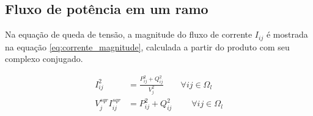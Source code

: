 \subsection{Fluxo de potência em um ramo}

Na equação de queda de tensão, a magnitude do fluxo de corrente $I_{ij}$ é mostrada na equação \ref{eq:corrente_magnitude}, calculada a partir do produto com seu complexo conjugado.

\begin{equation}
    \begin{split}
        I_{ij}^{2} &= \frac{P_{ij}^{2}+Q_{ij}^{2}}{V_{j}^{2}}\qquad\forall ij \in \Omega_{l}\\
        V_{j}^{sqr}I_{ij}^{sqr} &= P_{ij}^{2}+Q_{ij}^{2}\;\qquad\forall ij \in \Omega_{l}
    \end{split}
    \label{eq:corrente_magnitude}
\end{equation}
